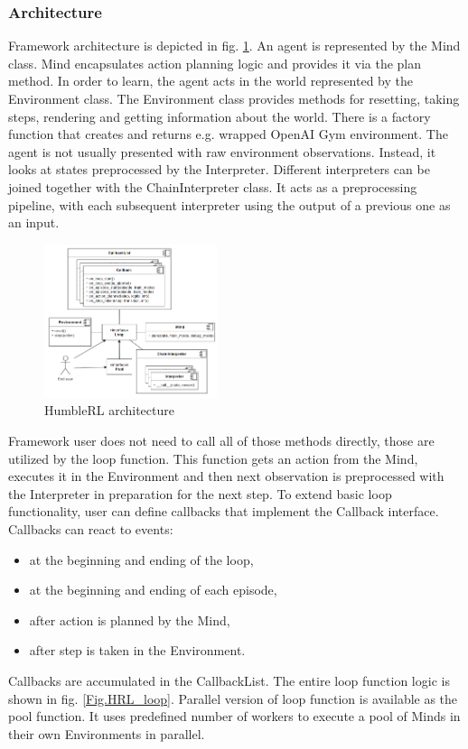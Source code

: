 \subsubsection{Architecture}
Framework architecture is depicted in fig. \ref{Fig.HRL_architecture}. An agent is represented by the Mind class. Mind encapsulates action planning logic and provides it via the plan method. In order to learn, the agent acts in the world represented by the Environment class. The Environment class provides methods for resetting, taking steps, rendering and getting information about the world. There is a factory function that creates and returns e.g. wrapped OpenAI Gym environment. The agent is not usually presented with raw environment observations. Instead, it looks at states preprocessed by the Interpreter. Different interpreters can be joined together with the ChainInterpreter class. It acts as a preprocessing pipeline, with each subsequent interpreter using the output of a previous one as an input.

\begin{figure}[H]
\includegraphics[width=0.45\textwidth,height=0.9\textheight,keepaspectratio]{figures/HumbleRL/architecture.png}
\caption{HumbleRL architecture}
\label{Fig.HRL_architecture}
\end{figure}

Framework user does not need to call all of those methods directly, those are utilized by the loop function. This function gets an action from the Mind, executes it in the Environment and then next observation is preprocessed with the Interpreter in preparation for the next step. To extend basic loop functionality, user can define callbacks that implement the Callback interface. Callbacks can react to events:
\begin{itemize}
\item at the beginning and ending of the loop,
\item at the beginning and ending of each episode,
\item after action is planned by the Mind,
\item after step is taken in the Environment.
\end{itemize}
Callbacks are accumulated in the CallbackList. The entire loop function logic is shown in fig. \ref{Fig.HRL_loop}.
Parallel version of loop function is available as the pool function. It uses predefined number of workers to execute a pool of Minds in their own Environments in parallel.

